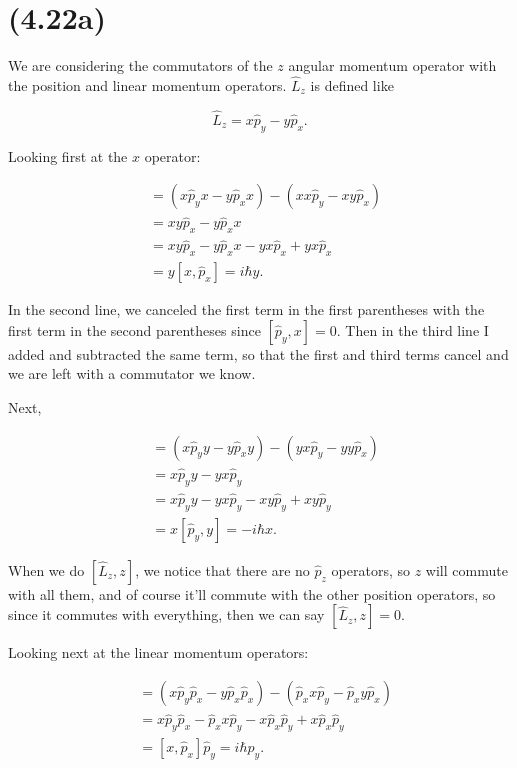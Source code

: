 \section{(4.22a)}


We are considering the commutators of the $z$ angular momentum operator with the position and linear momentum operators. $\hat{L}_z$ is defined like

\begin{equation}
    \hat{L}_z = x\hat{p}_y - y\hat{p}_x.
\end{equation}

Looking first at the $x$ operator:

\begin{align}
    [\hat{L}_z,x] &= (x\hat{p}_y x - y\hat{p}_x x) - (xx\hat{p}_y - xy\hat{p}_x) \\
    &= xy\hat{p}_x - y\hat{p}_x x \\
    &= xy\hat{p}_x - y\hat{p}_x x -yx \hat{p}_x + yx\hat{p}_x \\
    &= y[x,\hat{p}_x] = \boxed{i\hbar y.}
\end{align}

In the second line, we canceled the first term in the first parentheses with the first term in the second parentheses since $[\hat{p}_y,x] = 0$. Then in the third line I added and subtracted the same term, so that the first and third terms cancel and we are left with a commutator we know.

Next,

\begin{align}
    [\hat{L}_z,y] &= (x\hat{p}_y y - y\hat{p}_x y) - (yx\hat{p}_y - yy\hat{p}_x) \\
    &= x\hat{p}_y y - yx\hat{p}_y \\
    &= x\hat{p}_y y - yx\hat{p}_y  - xy\hat{p}_y + xy\hat{p}_y \\
    &= x[\hat{p}_y,y] = \boxed{-i\hbar x.}
\end{align}

When we do $[\hat{L}_z,z]$, we notice that there are no $\hat{p}_z$ operators, so $z$ will commute with all them, and of course it'll commute with the other position operators, so since it commutes with everything, then we can say $\boxed{[\hat{L}_z,z] = 0.}$

Looking next at the linear momentum operators:

\begin{align}
    [\hat{L}_x,\hat{p}_x] &= (x\hat{p}_y\hat{p}_x - y\hat{p}_x\hat{p}_x) - (\hat{p}_x x \hat{p}_y - \hat{p}_x y \hat{p}_x) \\
    &= x\hat{p}_y\hat{p}_x - \hat{p}_x x \hat{p}_y - x\hat{p}_x\hat{p}_y + x\hat{p}_x\hat{p}_y \\
    &= [x,\hat{p}_x]\hat{p}_y = \boxed{i\hbar\hat{p}_y.}
\end{align}

